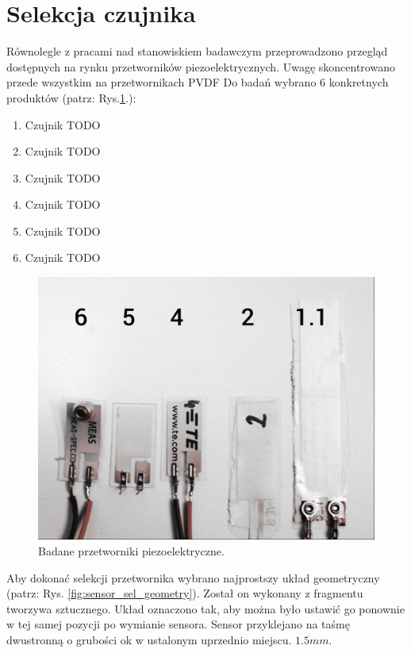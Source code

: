 \section{Selekcja czujnika}
\label{sec:sensor_selection}
Równolegle z pracami nad stanowiskiem badawczym przeprowadzono przegląd dostępnych na rynku przetworników piezoelektrycznych. Uwagę skoncentrowano przede wszystkim na przetwornikach PVDF\cite{PVDF:15}
Do badań wybrano 6 konkretnych produktów (patrz: Rys.\ref{fig:sensors}.):

\begin{enumerate}
\item Czujnik TODO
\item Czujnik TODO
\item Czujnik TODO
\item Czujnik TODO
\item Czujnik TODO
\item Czujnik TODO
\end{enumerate}


\begin{figure}[htbp]
\centering
\includegraphics[width=\linewidth]{pictures/sensors.jpg}
\caption{Badane przetworniki piezoelektryczne.}
\label{fig:sensors}
\end{figure}

Aby dokonać selekcji przetwornika wybrano najprostszy układ geometryczny (patrz: Rys. \ref{fig:sensor_sel_geometry}). Został on wykonany z fragmentu tworzywa sztucznego. Układ oznaczono tak, aby można było ustawić go ponownie w tej samej pozycji po wymianie sensora. Sensor przyklejano na taśmę dwustronną o grubości ok w ustalonym uprzednio miejscu. $1.5mm$. 

